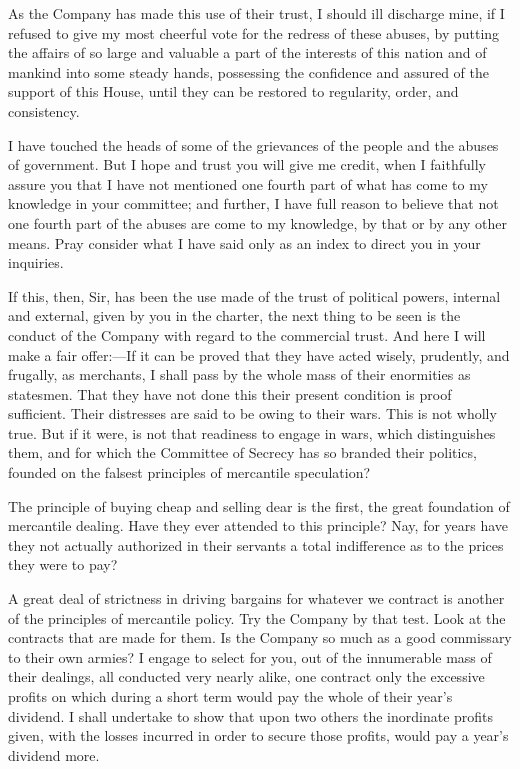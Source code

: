 As the Company has made this use of their trust, I should ill discharge mine, if I refused to give my most cheerful vote for the redress of these abuses, by putting the affairs of so large and valuable a part of the interests of this nation and of mankind into some steady hands, possessing the confidence and assured of the support of this House, until they can be restored to regularity, order, and consistency.

I have touched the heads of some of the grievances of the people and the abuses of government. But I hope and trust you will give me credit, when I faithfully assure you that I have not mentioned one fourth part of what has come to my knowledge in your committee; and further, I have full reason to believe that not one fourth part of the abuses are come to my knowledge, by that or by any other means. Pray consider what I have said only as an index to direct you in your inquiries.

If this, then, Sir, has been the use made of the trust of political powers, internal and external, given by you in the charter, the next thing to be seen is the conduct of the Company with regard to the commercial trust. And here I will make a fair offer:—If it can be proved that they have acted wisely, prudently, and frugally, as merchants, I shall pass by the whole mass of their enormities as statesmen. That they have not done this their present condition is proof sufficient. Their distresses are said to be owing to their wars. This is not wholly true. But if it were, is not that readiness to engage in wars, which distinguishes them, and for which the Committee of Secrecy has so branded their politics, founded on the falsest principles of mercantile speculation?

The principle of buying cheap and selling dear is the first, the great foundation of mercantile dealing. Have they ever attended to this principle? Nay, for years have they not actually authorized in their servants a total indifference as to the prices they were to pay?

A great deal of strictness in driving bargains for whatever we contract is another of the principles of mercantile policy. Try the Company by that test. Look at the contracts that are made for them. Is the Company so much as a good commissary to their own armies? I engage to select for you, out of the innumerable mass of their dealings, all conducted very nearly alike, one contract only the excessive profits on which during a short term would pay the whole of their year's dividend. I shall undertake to show that upon two others the inordinate profits given, with the losses incurred in order to secure those profits, would pay a year's dividend more.

